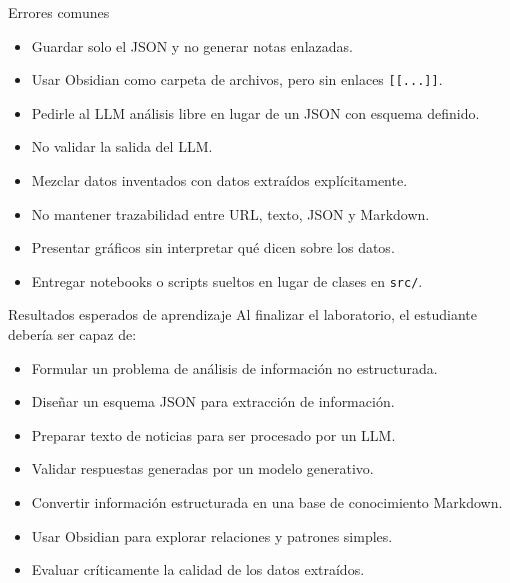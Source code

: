 \documentclass[11pt,aspectratio=169]{beamer}
\newcommand{\code}[1]{\texttt{#1}}
\begin{document}
\begin{frame}{Errores comunes}
\scriptsize
\begin{itemize}[<+->]
\item Guardar solo el JSON y no generar notas enlazadas.
\item Usar Obsidian como carpeta de archivos, pero sin enlaces \code{[[...]]}.
\item Pedirle al LLM análisis libre en lugar de un JSON con esquema definido.
\item No validar la salida del LLM.
\item Mezclar datos inventados con datos extraídos explícitamente.
\item No mantener trazabilidad entre URL, texto, JSON y Markdown.
\item Presentar gráficos sin interpretar qué dicen sobre los datos.
\item Entregar notebooks o scripts sueltos en lugar de clases en \code{src/}.
\end{itemize}
\end{frame}

\begin{frame}{Resultados esperados de aprendizaje}
\small
Al finalizar el laboratorio, el estudiante debería ser capaz de:
\begin{itemize}[<+->]
\item Formular un problema de análisis de información no estructurada.
\item Diseñar un esquema JSON para extracción de información.
\item Preparar texto de noticias para ser procesado por un LLM.
\item Validar respuestas generadas por un modelo generativo.
\item Convertir información estructurada en una base de conocimiento Markdown.
\item Usar Obsidian para explorar relaciones y patrones simples.
\item Evaluar críticamente la calidad de los datos extraídos.
\end{itemize}
\end{frame}
\end{document}
